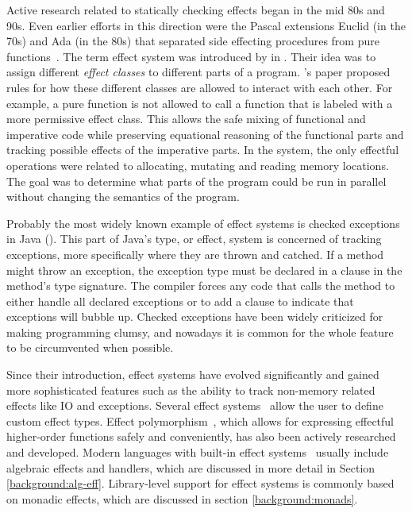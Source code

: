Active research related to statically checking effects began in the mid 80s and 90s. Even earlier efforts in this direction were the Pascal extensions Euclid (in the 70s) and Ada (in the 80s) that separated side effecting procedures from pure functions~\cite{real-prog-in-fp}. The term effect system was introduced by \textcite{intgr-fp-ip} in \citeyear{intgr-fp-ip}. Their idea was to assign different \textit{effect classes} to different parts of a program.
\citeauthor{intgr-fp-ip}'s paper proposed rules for how these different classes are allowed to interact with each other. For example, a pure function is not allowed to call a function that is labeled with a more permissive effect class. This allows the safe mixing of functional and imperative code while preserving equational reasoning of the functional parts and tracking possible effects of the imperative parts. In the system, the only effectful operations were related to allocating, mutating and reading memory locations. The goal was to determine what parts of the program could be run in parallel without changing the semantics of the program.

Probably the most widely known example of effect systems is checked exceptions in Java (). This part of Java's type, or effect, system is concerned of tracking exceptions, more specifically where they are thrown and catched. If a method might throw an exception, the exception type must be declared in a  clause in the method's type signature. The compiler forces any code that calls the method to either handle all declared exceptions or to add a  clause to indicate that exceptions will bubble up. Checked exceptions have been widely criticized for making programming clumsy, and nowadays it is common for the whole feature to be circumvented when possible.



Since their introduction, effect systems have evolved significantly and gained more sophisticated features such as the ability to track non-memory related effects like IO and exceptions. Several effect systems~\cite{koka-lang, frank-lang} allow the user to define custom effect types. Effect polymorphism~\cite{polymorphic-alg-effs}, which allows for expressing effectful higher-order functions safely and conveniently, has also been actively researched and developed. Modern languages with built-in effect systems~\cite{unison-lang, ocaml-lang} usually include algebraic effects and handlers, which are discussed in more detail in Section \ref{background:alg-eff}. Library-level support for effect systems is commonly based on monadic effects, which are discussed in section \ref{background:monads}.

